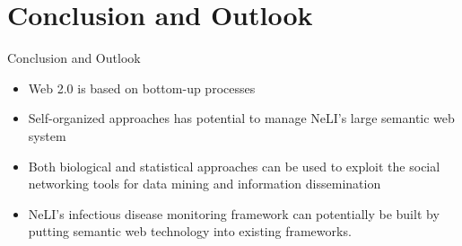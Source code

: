 \documentclass{beamer}
\begin{document}
\section{Conclusion and Outlook}
\begin{frame}[t]{Conclusion and Outlook}
  \begin{itemize}
    \item \small Web 2.0 is based on \alert{bottom-up processes}\\
    \item \small \alert{Self-organized approaches} has potential to manage NeLI's large semantic web system\\
    \item \small Both \alert{biological and statistical approaches} can be used to exploit the social networking tools for data mining and information dissemination\\
    \item \small \alert{NeLI's infectious disease monitoring framework} can potentially be built by putting semantic web technology into existing frameworks.\\
    \end{itemize}
\end{frame}

\end{document}
